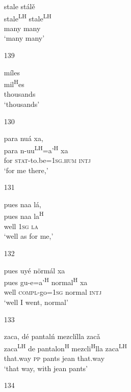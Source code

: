 \begin{itemize}
\glll   stale st\'{a}l\v{e}\\
stale\textsuperscript{LH} stale\textsuperscript{LH}\\
 many many\\
\glt `many many'
 



\item[139]
 
\glll   m\'{i}les\\
mil\textsuperscript{H}es\\
thousands\\
\glt `thousands'
 

\item[130]
 
\glll   para nu\'{a} xa, \\
para n-uu\textsuperscript{LH}=a'\textsuperscript{H} xa \\
for \textsc{stat}-to.be=\textsc{1sg.hum} \textsc{intj}\\
\glt `for me there,'
 


\item[131]
 
\glll   pues naa l\'{a}, \\
pues naa la\textsuperscript{H}\\
well \textsc{1sg} \textsc{la}\\
\glt `well as for me,'
 


\item[132]
 
\glll   pues uy\'{e} n\"{o}rm\'{a}l xa\\
pues gu-e=a'\textsuperscript{H} normal\textsuperscript{H} xa \\
well \textsc{compl}-go=\textsc{1sg} normal \textsc{intj}\\
\glt `well I went, normal'
 


\item[133]
 
\glll   zaca, d\'{e} pantal\'{n} mezcl\'{i}lla zac\v{a}\\
zaca\textsuperscript{LH} de pantalon\textsuperscript{H} mezcli\textsuperscript{H}lla zaca\textsuperscript{LH}\\
that.way \textsc{pp} pants jean that.way\\
\glt `that way, with jean pants'
 


\item[134]
 

\end{itemize}
